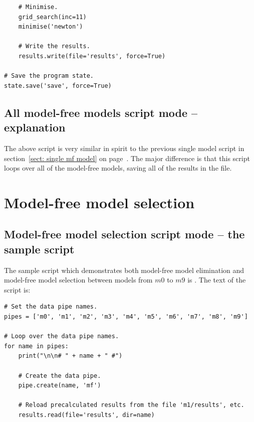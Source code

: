 \begin{htmlonly}
\begin{htmlonly}
\begin{lstlisting}
    # Minimise.
    grid_search(inc=11)
    minimise('newton')
    
    # Write the results.
    results.write(file='results', force=True)

# Save the program state.
state.save('save', force=True)
\end{lstlisting}



\subsection{All model-free models script mode -- explanation}

The above script is very similar in spirit to the previous single model script in section~\ref{sect: single mf model} on page~\pageref{sect: single mf model}.  The major difference is that this script loops over all of the model-free models, saving all of the results in the  file.




\section{Model-free model selection}



\subsection{Model-free model selection script mode -- the sample script}

The sample script which demonstrates both model-free model elimination and model-free model selection between models from $m0$ to $m9$ is .  The text of the script is:

\begin{lstlisting}
# Set the data pipe names.
pipes = ['m0', 'm1', 'm2', 'm3', 'm4', 'm5', 'm6', 'm7', 'm8', 'm9']

# Loop over the data pipe names.
for name in pipes:
    print("\n\n# " + name + " #")
    
    # Create the data pipe.
    pipe.create(name, 'mf')
    
    # Reload precalculated results from the file 'm1/results', etc.
    results.read(file='results', dir=name)


\end{lstlisting}
\end{htmlonly}
\end{htmlonly}
